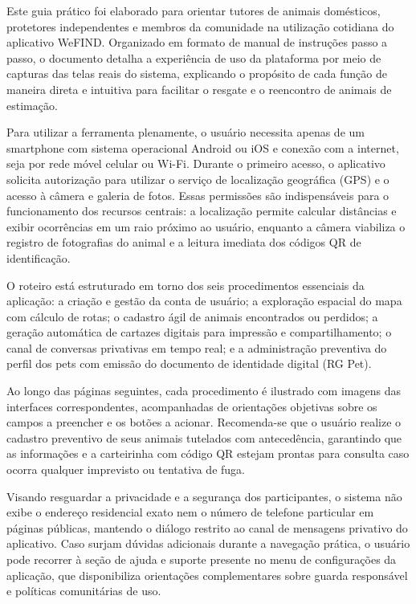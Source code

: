 Este guia prático foi elaborado para orientar tutores de animais domésticos, protetores independentes e membros da comunidade na utilização cotidiana do aplicativo WeFIND. Organizado em formato de manual de instruções passo a passo, o documento detalha a experiência de uso da plataforma por meio de capturas das telas reais do sistema, explicando o propósito de cada função de maneira direta e intuitiva para facilitar o resgate e o reencontro de animais de estimação.

Para utilizar a ferramenta plenamente, o usuário necessita apenas de um smartphone com sistema operacional Android ou iOS e conexão com a internet, seja por rede móvel celular ou Wi-Fi. Durante o primeiro acesso, o aplicativo solicita autorização para utilizar o serviço de localização geográfica (GPS) e o acesso à câmera e galeria de fotos. Essas permissões são indispensáveis para o funcionamento dos recursos centrais: a localização permite calcular distâncias e exibir ocorrências em um raio próximo ao usuário, enquanto a câmera viabiliza o registro de fotografias do animal e a leitura imediata dos códigos QR de identificação.

O roteiro está estruturado em torno dos seis procedimentos essenciais da aplicação: a criação e gestão da conta de usuário; a exploração espacial do mapa com cálculo de rotas; o cadastro ágil de animais encontrados ou perdidos; a geração automática de cartazes digitais para impressão e compartilhamento; o canal de conversas privativas em tempo real; e a administração preventiva do perfil dos pets com emissão do documento de identidade digital (RG Pet).

Ao longo das páginas seguintes, cada procedimento é ilustrado com imagens das interfaces correspondentes, acompanhadas de orientações objetivas sobre os campos a preencher e os botões a acionar. Recomenda-se que o usuário realize o cadastro preventivo de seus animais tutelados com antecedência, garantindo que as informações e a carteirinha com código QR estejam prontas para consulta caso ocorra qualquer imprevisto ou tentativa de fuga.

Visando resguardar a privacidade e a segurança dos participantes, o sistema não exibe o endereço residencial exato nem o número de telefone particular em páginas públicas, mantendo o diálogo restrito ao canal de mensagens privativo do aplicativo. Caso surjam dúvidas adicionais durante a navegação prática, o usuário pode recorrer à seção de ajuda e suporte presente no menu de configurações da aplicação, que disponibiliza orientações complementares sobre guarda responsável e políticas comunitárias de uso.


